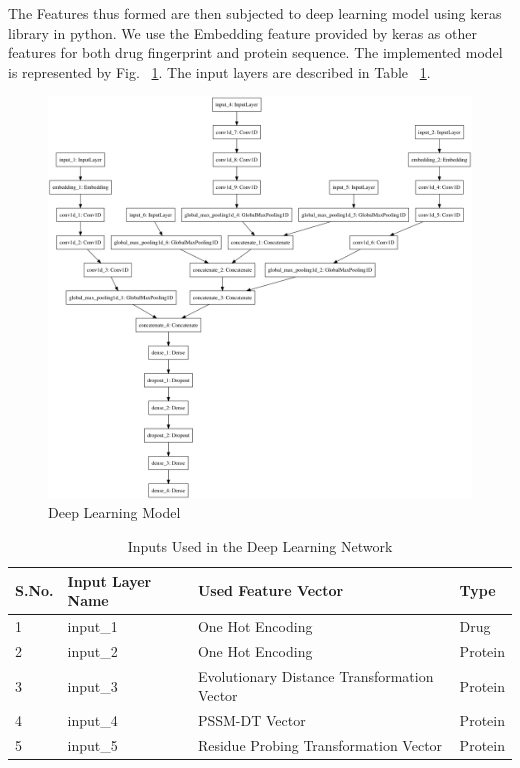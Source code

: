 The Features thus formed are then subjected to deep learning model using keras library in python. We use the Embedding feature provided by keras as other features for both drug fingerprint and protein sequence. The implemented model is represented by Fig. ~\ref{fig:dlm}. The input layers are described in Table ~\ref{table:inputs}.

\begin{figure}[ht]
\centering
\includegraphics[width=1\linewidth]{mainmatter/3-Methodology/images/build_combined_categorical_tensor_contact_new.png}
\caption{Deep Learning Model}
\label{fig:dlm}
\end{figure}
\begin{table}[ht]\centering
  \begin{tabular}{|l|l|l|l|}
    
    \hline \label{table:inputs}
    S.No. & Input Layer Name & Used Feature Vector & Type \\ \hline
    1 & input\_1 & One Hot Encoding & Drug \\ \hline
    2 & input\_2 & One Hot Encoding & Protein \\ \hline
    3 & input\_3 & Evolutionary Distance Transformation Vector& Protein \\ \hline
    4 & input\_4 & PSSM-DT Vector & Protein \\ \hline
    5 & input\_5 & Residue Probing Transformation Vector & Protein \\   \hline 
  \end{tabular} 
  \caption{Inputs Used in the Deep Learning Network} 
\end{table}

